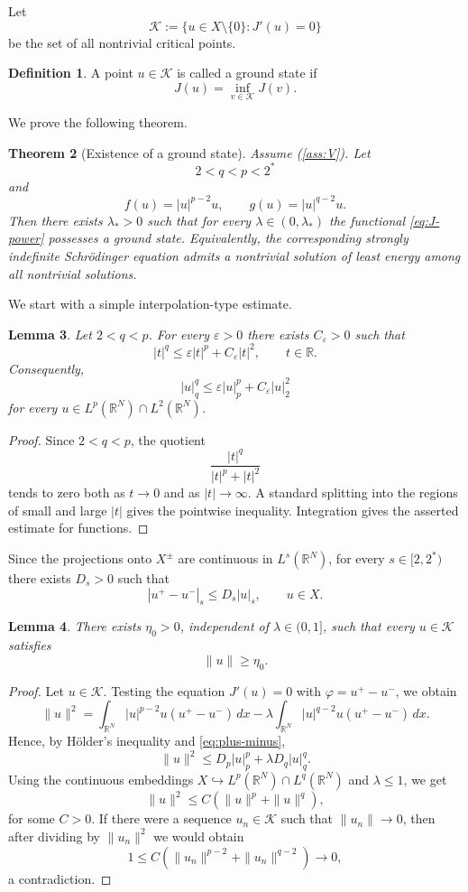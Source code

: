 \documentclass[11pt]{amsart}
\numberwithin{equation}{section}
\newtheorem{theorem}{Theorem}[section]
\newtheorem{lemma}[theorem]{Lemma}
\theoremstyle{definition}
\newtheorem{definition}[theorem]{Definition}
\newcommand{\R}{\mathbb{R}}
\newcommand{\cK}{\mathcal{K}}
\newcommand{\eps}{\varepsilon}
\begin{document}
Let
\[
\cK:=\{u\in X\setminus\{0\}:J'(u)=0\}
\]
be the set of all nontrivial critical points.

\begin{definition}
A point $u\in\cK$ is called a ground state if
\[
J(u)=\inf_{v\in\cK}J(v).
\]
\end{definition}

We prove the following theorem.

\begin{theorem}[Existence of a ground state]\label{thm:ground-state}
Assume (\ref{ass:V}). Let
\[
2<q<p<2^*
\]
and
\[
f(u)=|u|^{p-2}u,\qquad g(u)=|u|^{q-2}u.
\]
Then there exists $\lambda_*>0$ such that for every
$\lambda\in(0,\lambda_*)$ the functional \eqref{eq:J-power} possesses a
ground state. Equivalently, the corresponding strongly indefinite
Schrödinger equation admits a nontrivial solution of least energy among
all nontrivial solutions.
\end{theorem}

We start with a simple interpolation-type estimate.

\begin{lemma}\label{lem:power-two}
Let $2<q<p$. For every $\eps>0$ there exists $C_\eps>0$ such that
\[
|t|^q\le \eps |t|^p+C_\eps |t|^2,\qquad t\in\R.
\]
Consequently,
\[
|u|_q^q\le \eps |u|_p^p+C_\eps |u|_2^2
\]
for every $u\in L^p(\R^N)\cap L^2(\R^N)$.
\end{lemma}

\begin{proof}
Since $2<q<p$, the quotient
\[
\frac{|t|^q}{|t|^p+|t|^2}
\]
tends to zero both as $t\to0$ and as $|t|\to\infty$. A standard splitting
into the regions of small and large $|t|$ gives the pointwise inequality.
Integration gives the asserted estimate for functions.
\end{proof}

Since the projections onto $X^\pm$ are continuous in $L^s(\R^N)$, for
every $s\in[2,2^*)$ there exists $D_s>0$ such that
\begin{equation}\label{eq:plus-minus}
|u^+-u^-|_s\le D_s |u|_s,\qquad u\in X.
\end{equation}

\begin{lemma}\label{lem:away-zero-critical}
There exists $\eta_0>0$, independent of $\lambda\in(0,1]$, such that every
$u\in\cK$ satisfies
\[
\|u\|\ge \eta_0.
\]
\end{lemma}

\begin{proof}
Let $u\in\cK$. Testing the equation $J'(u)=0$ with
$\varphi=u^+-u^-$, we obtain
\[
\|u\|^2
=
\int_{\R^N}|u|^{p-2}u(u^+-u^-)\,dx
-\lambda\int_{\R^N}|u|^{q-2}u(u^+-u^-)\,dx.
\]
Hence, by Hölder's inequality and \eqref{eq:plus-minus},
\[
\|u\|^2
\le D_p|u|_p^p+\lambda D_q|u|_q^q.
\]
Using the continuous embeddings $X\hookrightarrow L^p(\R^N)\cap
L^q(\R^N)$ and $\lambda\le1$, we get
\[
\|u\|^2\le C(\|u\|^p+\|u\|^q),
\]
for some $C>0$. If there were a sequence $u_n\in\cK$ such that $\|u_n\|\to0$, then after
dividing by $\|u_n\|^2$ we would obtain
\[
1\le C(\|u_n\|^{p-2}+\|u_n\|^{q-2})\to0,
\]
a contradiction.
\end{proof}
\end{document}

